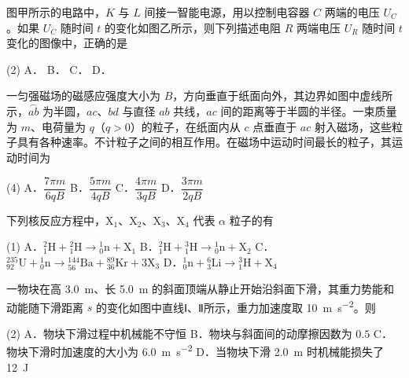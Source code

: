 \begin{question}
图甲所示的电路中，$K$ 与 $L$ 间接一智能电源，用以控制电容器 $C$ 两端的电压 $U_C$。如果 $U_C$ 随时间 $t$ 的变化如图乙所示，则下列描述电阻 $R$ 两端电压 $U_R$ 随时间 $t$ 变化的图像中，正确的是\gkblank


\begin{gkopts}(2)
  \task A．
  \task B．
  \task C．
  \task D．
\end{gkopts}
\end{question}

\begin{question}
一匀强磁场的磁感应强度大小为 $B$，方向垂直于纸面向外，其边界如图中虚线所示，$\overset{\frown}{ab}$ 为半圆，$ac$、$bd$ 与直径 $ab$ 共线，$ac$ 间的距离等于半圆的半径。一束质量为 $m$、电荷量为 $q$（$q>0$）的粒子，在纸面内从 $c$ 点垂直于 $ac$ 射入磁场，这些粒子具有各种速率。不计粒子之间的相互作用。在磁场中运动时间最长的粒子，其运动时间为\gkblank


\begin{gkopts}(4)
  \task A．$\dfrac{7\pi m}{6qB}$
  \task B．$\dfrac{5\pi m}{4qB}$
  \task C．$\dfrac{4\pi m}{3qB}$
  \task D．$\dfrac{3\pi m}{2qB}$
\end{gkopts}
\end{question}

\begin{question}
下列核反应方程中，$\mathrm{X}_1$、$\mathrm{X}_2$、$\mathrm{X}_3$、$\mathrm{X}_4$ 代表 $\alpha$ 粒子的有\gkblank

\begin{gkopts}(1)
  \task A．${}_{1}^{2}\mathrm{H}+{}_{1}^{2}\mathrm{H}\to{}_{0}^{1}\mathrm{n}+\mathrm{X}_1$
  \task B．${}_{1}^{2}\mathrm{H}+{}_{1}^{3}\mathrm{H}\to{}_{0}^{1}\mathrm{n}+\mathrm{X}_2$
  \task C．${}_{92}^{235}\mathrm{U}+{}_{0}^{1}\mathrm{n}\to{}_{56}^{144}\mathrm{Ba}+{}_{36}^{89}\mathrm{Kr}+3\mathrm{X}_3$
  \task D．${}_{0}^{1}\mathrm{n}+{}_{3}^{6}\mathrm{Li}\to{}_{1}^{3}\mathrm{H}+\mathrm{X}_4$
\end{gkopts}
\end{question}

\begin{question}
一物块在高 \SI{3.0}{\metre}、长 \SI{5.0}{\metre} 的斜面顶端从静止开始沿斜面下滑，其重力势能和动能随下滑距离 $s$ 的变化如图中直线Ⅰ、Ⅱ所示，重力加速度取 \SI{10}{\metre\per\second\squared}。则\gkblank


\begin{gkopts}(2)
  \task A．物块下滑过程中机械能不守恒
  \task B．物块与斜面间的动摩擦因数为 $0.5$
  \task C．物块下滑时加速度的大小为 \SI{6.0}{\metre\per\second\squared}
  \task D．当物块下滑 \SI{2.0}{\metre} 时机械能损失了 \SI{12}{\joule}
\end{gkopts}
\end{question}

